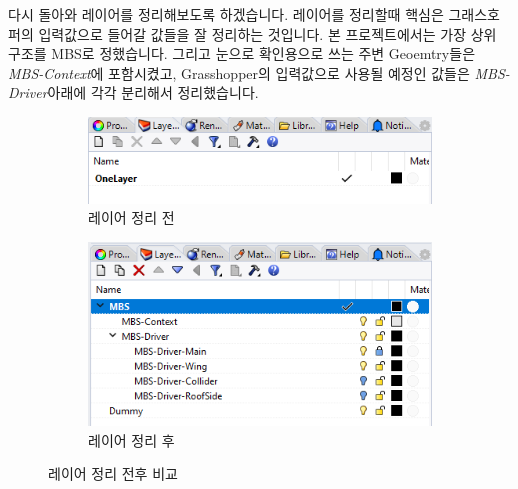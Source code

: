 \documentclass[11pt]{article}
\begin{document}
다시 돌아와 레이어를 정리해보도록 하겠습니다. 레이어를 정리할때 핵심은 그래스호퍼의 입력값으로 들어갈 값들을 잘 정리하는 것입니다. 본 프로젝트에서는 가장 상위 구조를 MBS로 정했습니다. 그리고 눈으로 확인용으로 쓰는 주변 Geoemtry들은 \textit{MBS-Context}에 포함시켰고,
Grasshopper의 입력값으로 사용될 예정인 값들은 \textit{MBS-Driver}아래에 각각 분리해서 정리했습니다.

\begin{figure}[H]
    \centering
    \begin{subfigure}{.45\textwidth}
        \centering
        \includegraphics[width=.9\textwidth]{./img/mbs_layer_before}
        \caption{레이어 정리 전}
        \label{fig:1}
    \end{subfigure}
    \begin{subfigure}{.45\textwidth}
        \centering
        \includegraphics[width=.9\textwidth]{./img/mbs_layer_after}
        \caption{레이어 정리 후}
        \label{fig:2}
    \end{subfigure}
    \caption{레이어 정리 전후 비교}
    \label{fig:layer_before_after}
\end{figure}
\end{document}
